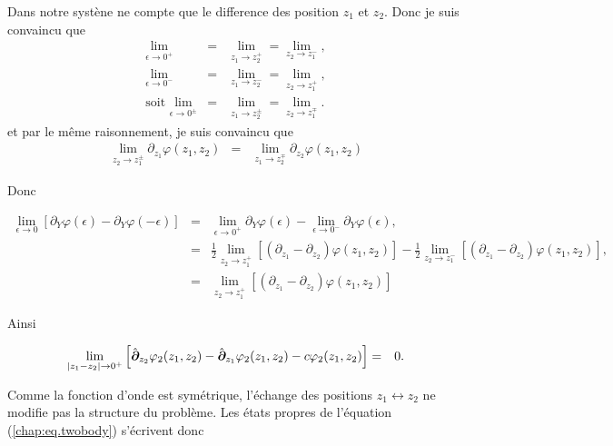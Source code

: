 {\color{lightgray} 
Dans notre systène ne compte que le difference des position $z_1$ et $z_2$. Donc je suis convaincu que  
\begin{eqnarray*}
	\underset{ \epsilon \to 0^+ }{\lim}	&=& \underset{ z_1 \to z_2^+ }{\lim} = \underset{ z_2 \to z_1^- }{\lim},\\
	\underset{ \epsilon \to 0^- }{\lim}	&=& \underset{ z_1 \to z_2^- }{\lim} = \underset{ z_2 \to z_1^+ }{\lim},  \\
	\mbox{soit   } \underset{ \epsilon \to 0^\pm  }{\lim}	&=& \underset{ z_1 \to z_2^\pm  }{\lim} = \underset{ z_2 \to z_1^\mp  }{\lim}.
\end{eqnarray*}
et par le même raisonnement, je suis convaincu que
\begin{eqnarray*}
	\underset{ z_2 \to z_1^\pm  }{\lim}	\partial_{z_1} \varphi (z_1, z_2) & = & \underset{ z_1 \to z_2^\mp  }{\lim}	\partial_{z_2} \varphi (z_1, z_2)
\end{eqnarray*}

Donc 

\begin{eqnarray*}
	\underset{ \epsilon \to 0 }{\lim}  \left [ \partial_Y \varphi(\epsilon) - \partial_Y \varphi(-\epsilon) \right ] & = & 	\underset{ \epsilon \to 0^+ }{\lim}   \partial_Y \varphi(\epsilon) 	 - \underset{ \epsilon \to 0^- }{\lim}  \partial_Y \varphi(\epsilon),\\
	& = &  \frac{1}2 \underset{ z_2 \to z_1^+ }{\lim} \left [ \left ( \partial_{z_1} -\partial_{z_2} \right )\varphi ( z_1 , z_2 ) \right ] -  \frac{1}2 \underset{ z_2 \to z_1^- }{\lim} \left [ \left ( \partial_{z_1} -\partial_{z_2} \right )\varphi ( z_1 , z_2 ) \right ],\\
	& = & \underset{ z_2 \to z_1^+ }{\lim} \left [ \left ( \partial_{z_1} -\partial_{z_2} \right )\varphi ( z_1 , z_2 ) \right ]
\end{eqnarray*}

Ainsi 
}
\begin{eqnarray}
	\underset{ \vert z_1 - z_2 \vert  \to 0^+ }{\lim}  \left [  \hat{\bm{\partial}}_{z_2}  \varphi _2( z_1 , z_2 ) - \hat{\bm{\partial}}_{z_1}  \varphi_2 ( z_1 , z_2 ) - c  \varphi_2 ( z_1 , z_2 ) \right ] & = &0.  		
\end{eqnarray}


Comme la fonction d’onde est symétrique, l’échange des positions $z_1 \leftrightarrow z_2$ ne modifie pas la structure du problème. Les états propres de l’équation (\ref{chap:eq.twobody}) s’écrivent donc


